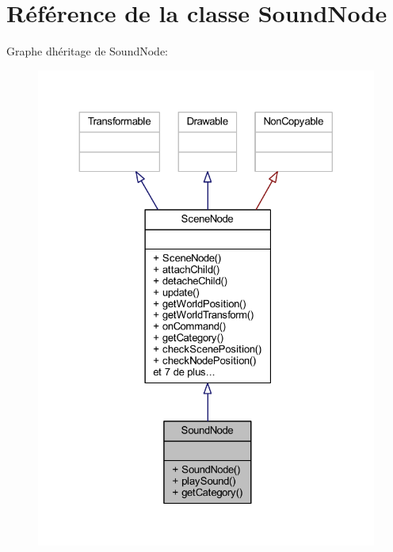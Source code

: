 \hypertarget{class_sound_node}{}\section{Référence de la classe Sound\+Node}
\label{class_sound_node}


Graphe d\textquotesingle{}héritage de Sound\+Node\+:\nopagebreak
\begin{figure}[H]
\begin{center}
\leavevmode
\includegraphics[width=324pt]{class_sound_node__inherit__graph}
\end{center}
\end{figure}


